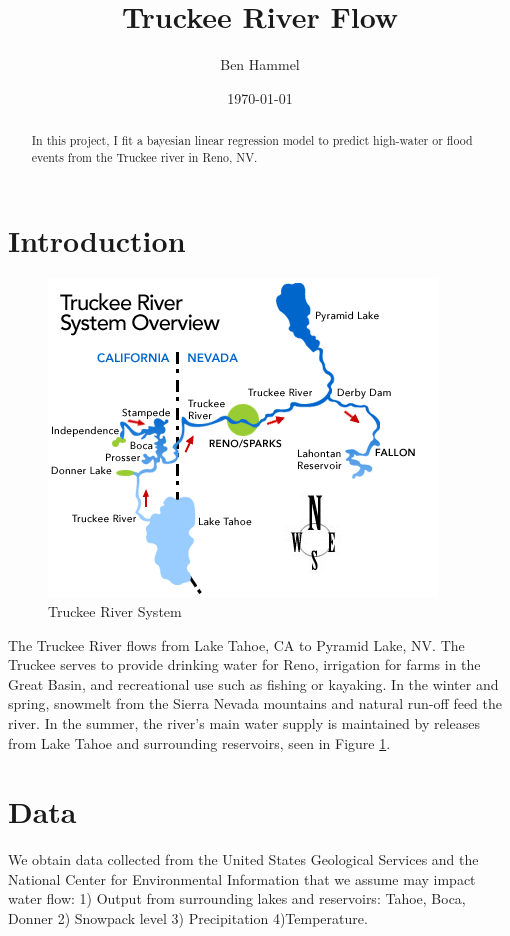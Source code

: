 \documentclass[11pt]{article}
\title{\vspace{-80pt}Truckee River Flow}
\author{Ben Hammel}
\date{\today}
\begin{document}
\maketitle

\vspace{-20pt}
\begin{abstract}
\noindent
In this project, I fit a bayesian linear regression model to predict high-water or flood events from the Truckee river in Reno, NV.
\end{abstract}

\section{Introduction}
\label{S:1}

\begin{figure}[h]
\centering\includegraphics[width=.4\linewidth]{riversystem_map.jpg}
\caption{Truckee River System}
\label{Fig. 1}
\end{figure}
The Truckee River flows from Lake Tahoe, CA to Pyramid Lake, NV. The Truckee serves to provide drinking water for Reno, irrigation for farms in the Great Basin, and recreational use such as fishing or kayaking. In the winter and spring, snowmelt from the Sierra Nevada mountains and natural run-off feed the river. In the summer, the river's main water supply is maintained by releases from Lake Tahoe and surrounding reservoirs, seen in Figure \ref{Fig. 1}.

\section{Data}

We obtain data collected from the United States Geological Services \cite{U.S.G.S.:2019aa} and the National Center for Environmental Information \cite{Menne:2019aa} that we assume may impact water flow: 1) Output from surrounding lakes and reservoirs: Tahoe, Boca, Donner
2) Snowpack level 3)  Precipitation 4)Temperature.
\end{document}
